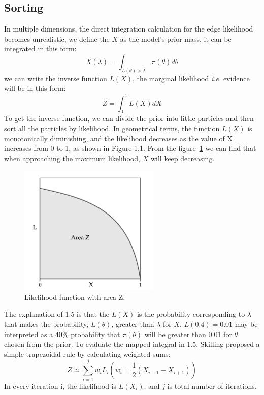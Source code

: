 \documentclass[11pt]{book}
\begin{document}
\subsection{Sorting}
In multiple dimensions, the direct integration calculation for the edge likelihood becomes unrealistic, we define the 
 $X$ as the model's prior mass, it can be integrated in this form:
 \begin{equation}
	X(\lambda) = \int _{L(\theta)> \lambda}\pi(\theta)d\theta
 \end{equation}
 we can write the inverse function $L(X)$, the marginal likelihood \textit{i.e.} evidence will
 be in this form:
 \begin{equation}
	 Z = \int ^{1}_{0} L(X) dX
 \end{equation}
 To get the inverse function, we can divide the prior into little particles and then sort all the particles by likelihood.
 In geometrical terms, the function $L(X)$ is monotonically diminishing, and the likelihood decreases as the value of X increases from 0 to 1, as shown in Figure 1.1.
From the figure~\ref{fig:modes} we can find that when approaching the maximum likelihood, $X$ will keep decreasing.
 \begin{center}
	\begin{figure}
			\centering
			\includegraphics[width=0.6\textwidth]{areaz}
			\caption{Likelihood function with area Z.}
			\label{fig:modes}
	\end{figure}
	\end{center}

The explanation of 1.5 is that the $L(X)$ is the probability corresponding to $\lambda$ that makes the probability, $L(\theta)$, greater than $\lambda$ for $X$. 
$L(0.4) = 0.01$ may be interpreted as a 40$\%$ probability that $\pi(\theta)$ will be greater than 0.01 for $\theta$ chosen from the prior.
To evaluate the mapped integral in 1.5, Skilling proposed a simple trapezoidal rule by calculating 
weighted sums:
\begin{equation}
	Z \approx \sum_{i=1}^{j}w_iL_i (w_i = \frac{1}{2}(X_{i-1} -X_{i+1}))
\end{equation}
In every iteration i, the likelihood is $L(X_i)$, and $j$ is total number of iterations.
\end{document}
